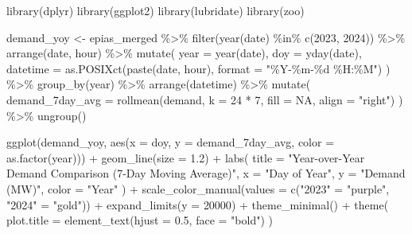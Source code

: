 \documentclass[
  11pt,
  a4paper,
]{article}
\newenvironment{Shaded}{\begin{snugshade}}{\end{snugshade}}
\newcommand{\AttributeTok}[1]{\textcolor[rgb]{0.40,0.45,0.13}{#1}}
\newcommand{\ConstantTok}[1]{\textcolor[rgb]{0.56,0.35,0.01}{#1}}
\newcommand{\DecValTok}[1]{\textcolor[rgb]{0.68,0.00,0.00}{#1}}
\newcommand{\FloatTok}[1]{\textcolor[rgb]{0.68,0.00,0.00}{#1}}
\newcommand{\FunctionTok}[1]{\textcolor[rgb]{0.28,0.35,0.67}{#1}}
\newcommand{\NormalTok}[1]{\textcolor[rgb]{0.00,0.23,0.31}{#1}}
\newcommand{\OtherTok}[1]{\textcolor[rgb]{0.00,0.23,0.31}{#1}}
\newcommand{\SpecialCharTok}[1]{\textcolor[rgb]{0.37,0.37,0.37}{#1}}
\newcommand{\StringTok}[1]{\textcolor[rgb]{0.13,0.47,0.30}{#1}}
\begin{document}
\begin{Shaded}
\begin{Highlighting}[]
\FunctionTok{library}\NormalTok{(dplyr)}
\FunctionTok{library}\NormalTok{(ggplot2)}
\FunctionTok{library}\NormalTok{(lubridate)}
\FunctionTok{library}\NormalTok{(zoo)}

\NormalTok{demand\_yoy }\OtherTok{\textless{}{-}}\NormalTok{ epias\_merged }\SpecialCharTok{\%\textgreater{}\%}
  \FunctionTok{filter}\NormalTok{(}\FunctionTok{year}\NormalTok{(date) }\SpecialCharTok{\%in\%} \FunctionTok{c}\NormalTok{(}\DecValTok{2023}\NormalTok{, }\DecValTok{2024}\NormalTok{)) }\SpecialCharTok{\%\textgreater{}\%}
  \FunctionTok{arrange}\NormalTok{(date, hour) }\SpecialCharTok{\%\textgreater{}\%}
  \FunctionTok{mutate}\NormalTok{(}
    \AttributeTok{year =} \FunctionTok{year}\NormalTok{(date),}
    \AttributeTok{doy =} \FunctionTok{yday}\NormalTok{(date),}
    \AttributeTok{datetime =} \FunctionTok{as.POSIXct}\NormalTok{(}\FunctionTok{paste}\NormalTok{(date, hour), }\AttributeTok{format =} \StringTok{"\%Y{-}\%m{-}\%d \%H:\%M"}\NormalTok{)}
\NormalTok{  ) }\SpecialCharTok{\%\textgreater{}\%}
  \FunctionTok{group\_by}\NormalTok{(year) }\SpecialCharTok{\%\textgreater{}\%}
  \FunctionTok{arrange}\NormalTok{(datetime) }\SpecialCharTok{\%\textgreater{}\%}
  \FunctionTok{mutate}\NormalTok{(}
    \AttributeTok{demand\_7day\_avg =} \FunctionTok{rollmean}\NormalTok{(demand, }\AttributeTok{k =} \DecValTok{24} \SpecialCharTok{*} \DecValTok{7}\NormalTok{, }\AttributeTok{fill =} \ConstantTok{NA}\NormalTok{, }\AttributeTok{align =} \StringTok{"right"}\NormalTok{)}
\NormalTok{  ) }\SpecialCharTok{\%\textgreater{}\%}
  \FunctionTok{ungroup}\NormalTok{()}

\FunctionTok{ggplot}\NormalTok{(demand\_yoy, }\FunctionTok{aes}\NormalTok{(}\AttributeTok{x =}\NormalTok{ doy, }\AttributeTok{y =}\NormalTok{ demand\_7day\_avg, }\AttributeTok{color =} \FunctionTok{as.factor}\NormalTok{(year))) }\SpecialCharTok{+}
  \FunctionTok{geom\_line}\NormalTok{(}\AttributeTok{size =} \FloatTok{1.2}\NormalTok{) }\SpecialCharTok{+}
  \FunctionTok{labs}\NormalTok{(}
    \AttributeTok{title =} \StringTok{"Year{-}over{-}Year Demand Comparison (7{-}Day Moving Average)"}\NormalTok{,}
    \AttributeTok{x =} \StringTok{"Day of Year"}\NormalTok{,}
    \AttributeTok{y =} \StringTok{"Demand (MW)"}\NormalTok{,}
    \AttributeTok{color =} \StringTok{"Year"}
\NormalTok{  ) }\SpecialCharTok{+}
  \FunctionTok{scale\_color\_manual}\NormalTok{(}\AttributeTok{values =} \FunctionTok{c}\NormalTok{(}\StringTok{"2023"} \OtherTok{=} \StringTok{"purple"}\NormalTok{, }\StringTok{"2024"} \OtherTok{=} \StringTok{"gold"}\NormalTok{)) }\SpecialCharTok{+}
  \FunctionTok{expand\_limits}\NormalTok{(}\AttributeTok{y =} \DecValTok{20000}\NormalTok{) }\SpecialCharTok{+}
  \FunctionTok{theme\_minimal}\NormalTok{() }\SpecialCharTok{+}
  \FunctionTok{theme}\NormalTok{(}
    \AttributeTok{plot.title =} \FunctionTok{element\_text}\NormalTok{(}\AttributeTok{hjust =} \FloatTok{0.5}\NormalTok{, }\AttributeTok{face =} \StringTok{"bold"}\NormalTok{)}
\NormalTok{  )}
\end{Highlighting}
\end{Shaded}
\end{document}
